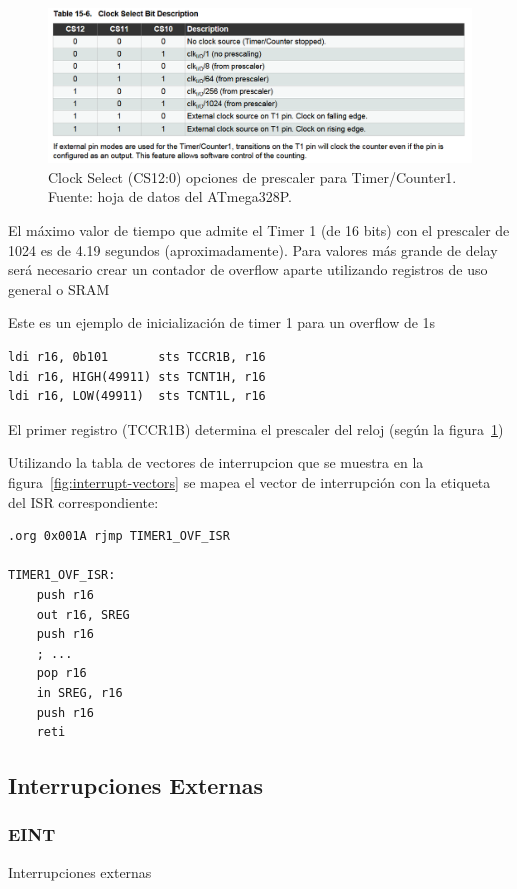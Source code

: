 \begin{figure}[H]
  \centering
  \includegraphics[width=\linewidth]{./Anexos/Marco Teorico/Timers/Prescaler Table.png}
  \caption{Clock Select (CS12:0) opciones de prescaler para Timer/Counter1. Fuente: hoja de datos del ATmega328P\@\cite{atmega328p_datasheet}.}
  \label{fig:prescaler-table}
\end{figure}


El máximo valor de tiempo que admite el Timer 1 (de 16 bits) con el prescaler de 1024 es de 4.19 segundos (aproximadamente). Para valores más grande de delay será necesario crear un contador de overflow aparte utilizando registros de uso general o SRAM

Este es un ejemplo de inicialización de timer 1 para un overflow de 1s

\begin{verbatim}
ldi r16, 0b101       sts TCCR1B, r16
ldi r16, HIGH(49911) sts TCNT1H, r16
ldi r16, LOW(49911)  sts TCNT1L, r16 
\end{verbatim}

El primer registro (TCCR1B) determina el prescaler del reloj (según la figura\ \ref{fig:prescaler-table})

Utilizando la tabla de vectores de interrupcion que se muestra en la figura\ \ref{fig:interrupt-vectors} se mapea el vector de interrupción con la etiqueta del ISR correspondiente:

\begin{verbatim}
.org 0x001A rjmp TIMER1_OVF_ISR

TIMER1_OVF_ISR:
    push r16
    out r16, SREG
    push r16
    ; ... 
    pop r16
    in SREG, r16
    push r16
    reti
\end{verbatim}

\subsection{Interrupciones Externas}
   \subsubsection{EINT}
    Interrupciones externas 

